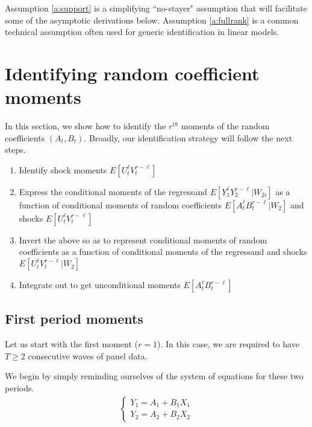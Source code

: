 Assumption \ref{a:support} is a simplifying ``no-stayer" assumption that will facilitate some of the asymptotic derivations below. Assumption \ref{a:fullrank} is a common technical assumption often used for generic identification in linear models.

\section{Identifying random coefficient moments}

In this section, we show how to identify the $r^{th}$ moments of the random coefficients $(A_{t}, B_{t})$. Broadly, our identification strategy will follow the next steps.

\begin{enumerate}
  \item Identify shock moments $E[U_{t}^{\ell}V_{t}^{r-\ell}]$ 
  
  \item Express the conditional moments of the regressand $E[Y_{1}^\ell Y_{2}^{r - \ell} | W_{2i}]$ as a function of conditional moments of random coefficients $E[A_{t}^{\ell}B_{t}^{r-\ell}|W_{2}]$ and shocks $E[U_{t}^{\ell}V_{t}^{r-\ell}]$ 
  
  \item Invert the above so as to represent conditional moments of random coefficients as a function of conditional moments of the regressand and shocks $E[U_{t}^{\ell}V_{t}^{r-\ell}|W_{2}]$ 
  
  \item Integrate out to get unconditional moments $E[A_{t}^{\ell}B_{t}^{r-\ell}]$
\end{enumerate}

\subsection{First period moments}

Let us start with the first moment ($r = 1$). In this case, we are required to have $T \geq 2$ consecutive waves of panel data. 


We begin by simply reminding ourselves of the system of equations for these two periods.
\begin{align}
  \begin{cases}
    Y_{1} = A_{1} + B_{1}X_{1} \\ 
    Y_{2} = A_{2} + B_{2}X_{2} 
  \end{cases}
\end{align}

